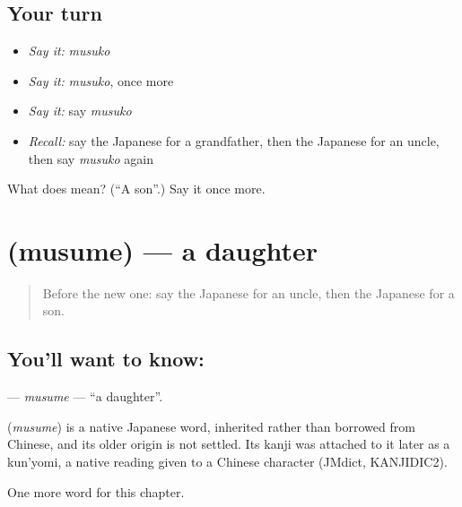 \subsection*{Your turn}
\begin{itemize}
\raggedright
  \item \emph{Say it:} \emph{musuko}
  \item \emph{Say it:} \emph{musuko}, once more
  \item \emph{Say it:} say \emph{musuko}
  \item \emph{Recall:} say the Japanese for a grandfather, then the Japanese for an uncle, then say \emph{musuko} again
\end{itemize}

\begin{tcolorbox}[breakable,colback=teal!4,colframe=teal!35!black,title={Before you move on}]
What does  mean? (\textquotedblleft{}A son\textquotedblright{}.) Say it once more.
\end{tcolorbox}
\section[\texorpdfstring{\ja{むすめ} (musume)}{むすめ (musume)}]{ (musume) — a daughter}

\label{lesson:JA-C24-musume}



\begin{quote}
Before the new one: say the Japanese for an uncle, then the Japanese for a son.
\end{quote}

\subsection*{You'll want to know: }
\textbf{} — \emph{musume} — \textquotedblleft{}a daughter\textquotedblright{}.

\begin{cousinweb}
\textbf{} (\emph{musume}) is a native Japanese word, inherited rather than borrowed from Chinese, and its older origin is not settled. Its kanji was attached to it later as a kun'yomi, a native reading given to a Chinese character (JMdict, KANJIDIC2).
\end{cousinweb}

\begin{grammarlens}[title={What you've built}]
One more word for this chapter.
\end{grammarlens}

